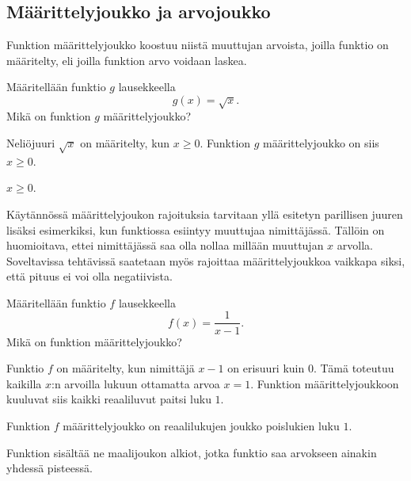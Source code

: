 \subsection*{Määrittelyjoukko ja arvojoukko}

Funktion määrittelyjoukko koostuu niistä muuttujan arvoista, joilla
funktio on määritelty, eli joilla funktion arvo voidaan laskea.

\begin{esimerkki}
	 Määritellään funktio $g$ lausekkeella \[ g(x) = \sqrt{x}. \]
	 Mikä on funktion $g$ määrittelyjoukko?
	 \begin{esimratk}
		Neliöjuuri $\sqrt{x}$ on määritelty, kun $x\geq{0}$. Funktion $g$ määrittelyjoukko on siis $x\geq{0}$.
	 \end{esimratk}
	 \begin{esimvast}
	  $x\geq{0}$.
	 \end{esimvast}
\end{esimerkki}

Käytännössä määrittelyjoukon rajoituksia tarvitaan yllä esitetyn parillisen juuren lisäksi esimerkiksi, kun funktiossa esiintyy muuttujaa nimittäjässä.
Tällöin on huomioitava, ettei nimittäjässä saa olla nollaa millään muuttujan $x$ arvolla. 
Soveltavissa tehtävissä saatetaan myös rajoittaa määrittelyjoukkoa vaikkapa siksi, että pituus ei voi olla negatiivista.

\begin{esimerkki}
	Määritellään funktio $f$ lausekkeella \[ f(x) = \frac{1}{x-1}. \]
	Mikä on funktion määrittelyjoukko?
	\begin{esimratk}
		Funktio $f$ on määritelty, kun nimittäjä $x-1$ on erisuuri kuin 0.
		Tämä toteutuu kaikilla $x$:n arvoilla lukuun ottamatta arvoa $x = 1$.
		Funktion määrittelyjoukkoon kuuluvat siis kaikki reaaliluvut paitsi luku $1$.
	\end{esimratk}
	\begin{esimvast}
		Funktion $f$ määrittelyjoukko on reaalilukujen joukko poislukien luku $1$.
	\end{esimvast}
\end{esimerkki}


Funktion  sisältää ne maalijoukon alkiot,
jotka funktio saa arvokseen ainakin yhdessä pisteessä.

